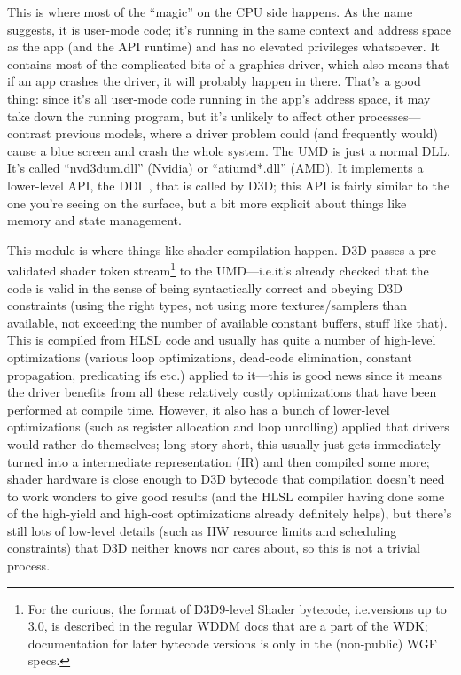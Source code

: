 This is where most of the ``magic'' on the CPU side happens. As the name 
suggests, it is user-mode code; it's running in the same context and address 
space as the app (and the API runtime) and has no elevated privileges 
whatsoever. It contains most of the complicated bits of a graphics driver, 
which also means that if an app crashes the driver, it will probably happen in 
there.  That's a good thing: since it's all user-mode code running in the app's 
address space, it may take down the running program, but it's unlikely to 
affect other processes---contrast previous models, where a driver problem could 
(and frequently would) cause a blue screen and crash the whole system.
The UMD is just a normal DLL. It's called ``nvd3dum.dll'' (Nvidia) or 
``atiumd*.dll'' (AMD).  It implements a lower-level API, the 
DDI~\citep{umd-ddi}, that is called by D3D; this API is fairly similar to the 
one you're seeing on the surface, but a bit
more explicit about things like memory and state management.

This module is where things like shader compilation happen. D3D passes a
pre-validated shader token stream\footnote{For the curious, the format of 
D3D9-level Shader bytecode, i.e.\@ versions up to 3.0, is described in the 
regular WDDM docs that are a part of the WDK; documentation for later bytecode 
versions is only in the (non-public) WGF specs.} to the UMD---i.e.\@ it's 
already checked that the code is valid in the sense of being syntactically 
correct and obeying D3D constraints (using the right types, not using more 
textures/samplers than
available, not exceeding the number of available constant buffers, stuff like
that). This is compiled from HLSL code and usually has quite a number of
high-level optimizations (various loop optimizations, dead-code elimination,
constant propagation, predicating ifs etc.) applied to it---this is good news
since it means the driver benefits from all these relatively costly
optimizations that have been performed at compile time. However, it also has a
bunch of lower-level optimizations (such as register allocation and loop
unrolling) applied that drivers would rather do themselves; long story short,
this usually just gets immediately turned into a intermediate representation
(IR) and then compiled some more; shader hardware is close enough to D3D
bytecode that compilation doesn't need to work wonders to give good results
(and the HLSL compiler having done some of the high-yield and high-cost
optimizations already definitely helps), but there's still lots of low-level
details (such as HW resource limits and scheduling constraints) that D3D
neither knows nor cares about, so this is not a trivial process.

